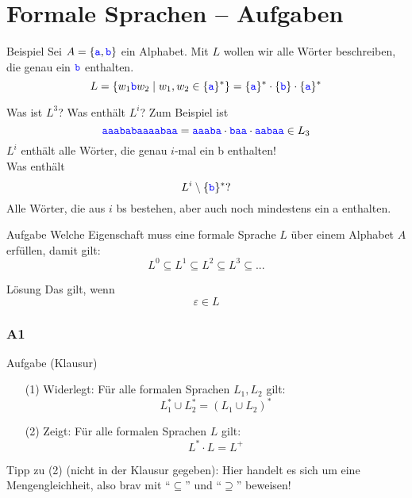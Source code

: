 \section{Formale Sprachen – Aufgaben}

\begin{frame}{Beispiel}
	Sei $A = \left\{\hbox{\textcolor{blue}{\texttt{a}}},\hbox{\textcolor{blue}{\texttt{b}}}\right\}$ ein Alphabet. Mit $L$ wollen wir alle Wörter beschreiben, die genau ein $\hbox{\textcolor{blue}{\texttt{b}}}$ enthalten. \\ \pause
	$$ L = \left\{w_1 \hbox{\textcolor{blue}{\texttt{b}}} w_2 \mid w_1, w_2 \in \{\hbox{\textcolor{blue}{\texttt{a}}}\}^\ast \right\} = \{\hbox{\textcolor{blue}{\texttt{a}}}\}^\ast \cdot \{\hbox{\textcolor{blue}{\texttt{b}}} \} \cdot \{\hbox{\textcolor{blue}{\texttt{a}}}\}^\ast$$
	
	Was ist $L^3$? Was enthält $L^i$? \pause
	Zum Beispiel ist $$\hbox{\textcolor{blue}{\texttt{aaababaaaabaa}}} = \hbox{\textcolor{blue}{\texttt{aaaba}}} \cdot \hbox{\textcolor{blue}{\texttt{baa}}} \cdot \hbox{\textcolor{blue}{\texttt{aabaa}}} \in L_3$$ \pause
	$L^i$ enthält alle Wörter, die genau $i$-mal ein \word b enthalten! \\[1em]
	
	Was enthält $$L^i \setminus \{\hbox{\textcolor{blue}{\texttt{b}}}\}^\ast ?$$ \pause
	Alle Wörter, die aus $i$ \word bs bestehen, aber auch noch mindestens ein \word a enthalten. \\
\end{frame}

\begin{frame}{Aufgabe}
	Welche Eigenschaft muss eine formale Sprache $L$ über einem Alphabet
	$A$ erfüllen, damit gilt: $$ L^0 \subseteq L^1 \subseteq L^2 \subseteq L^3 \subseteq ... $$
	
	\pause
	\begin{block}{Lösung}
		Das gilt, wenn $$ \varepsilon \in L $$
	\end{block}
	
\end{frame}

\subsubsection{A1}
\begin{frame}{Aufgabe (Klausur)}
		\begin{itemize}
			\item[(1)] Widerlegt: Für alle formalen Sprachen $L_1 , L_2$ gilt: 
			$$L_1^\ast \cup L_2^\ast = (L_1 \cup L_2 )^\ast$$
			
			\item[(2)] Zeigt: Für alle formalen Sprachen $L$ gilt: 
				$$L^\ast \cdot L = L^+ $$ 
	\end{itemize}

	Tipp zu (2) (nicht in der Klausur gegeben): Hier handelt es sich um eine Mengengleichheit, also brav mit \enquote{$\subseteq$} und \enquote{$\supseteq$} beweisen! \smiley 
\end{frame}

